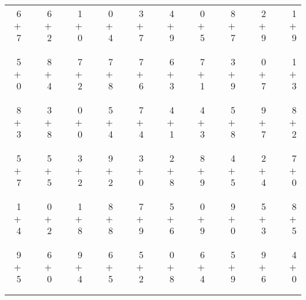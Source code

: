 \documentclass[12pt, letterpaper]{article}
\begin{document}
\begin{tabular}{rrrrrrrrrrrrrrrrrrr}
6 & & 6 & & 1 & & 0 & & 3 & & 4 & & 0 & & 8 & & 2 & & 1\\
$+$ 7 & & $+$ 2 & & $+$ 0 & & $+$ 4 & & $+$ 7 & & $+$ 9 & & $+$ 5 & & $+$ 7 & & $+$ 9 & & $+$ 9\\
\cline{1-1} \cline{3-3} \cline{5-5} \cline{7-7} \cline{9-9} \cline{11-11} \cline{13-13} \cline{15-15} \cline{17-17} \cline{19-19} \\ \\
5 & & 8 & & 7 & & 7 & & 7 & & 6 & & 7 & & 3 & & 0 & & 1\\
$+$ 0 & & $+$ 4 & & $+$ 2 & & $+$ 8 & & $+$ 6 & & $+$ 3 & & $+$ 1 & & $+$ 9 & & $+$ 7 & & $+$ 3\\
\cline{1-1} \cline{3-3} \cline{5-5} \cline{7-7} \cline{9-9} \cline{11-11} \cline{13-13} \cline{15-15} \cline{17-17} \cline{19-19} \\ \\
8 & & 3 & & 0 & & 5 & & 7 & & 4 & & 4 & & 5 & & 9 & & 8\\
$+$ 3 & & $+$ 8 & & $+$ 0 & & $+$ 4 & & $+$ 4 & & $+$ 1 & & $+$ 3 & & $+$ 8 & & $+$ 7 & & $+$ 2\\
\cline{1-1} \cline{3-3} \cline{5-5} \cline{7-7} \cline{9-9} \cline{11-11} \cline{13-13} \cline{15-15} \cline{17-17} \cline{19-19} \\ \\
5 & & 5 & & 3 & & 9 & & 3 & & 2 & & 8 & & 4 & & 2 & & 7\\
$+$ 7 & & $+$ 5 & & $+$ 2 & & $+$ 2 & & $+$ 0 & & $+$ 8 & & $+$ 9 & & $+$ 5 & & $+$ 4 & & $+$ 0\\
\cline{1-1} \cline{3-3} \cline{5-5} \cline{7-7} \cline{9-9} \cline{11-11} \cline{13-13} \cline{15-15} \cline{17-17} \cline{19-19} \\ \\
1 & & 0 & & 1 & & 8 & & 7 & & 5 & & 0 & & 9 & & 5 & & 8\\
$+$ 4 & & $+$ 2 & & $+$ 8 & & $+$ 8 & & $+$ 9 & & $+$ 6 & & $+$ 9 & & $+$ 0 & & $+$ 3 & & $+$ 5\\
\cline{1-1} \cline{3-3} \cline{5-5} \cline{7-7} \cline{9-9} \cline{11-11} \cline{13-13} \cline{15-15} \cline{17-17} \cline{19-19} \\ \\
9 & & 6 & & 9 & & 6 & & 5 & & 0 & & 6 & & 5 & & 9 & & 4\\
$+$ 5 & & $+$ 0 & & $+$ 4 & & $+$ 5 & & $+$ 2 & & $+$ 8 & & $+$ 4 & & $+$ 9 & & $+$ 6 & & $+$ 0\\
\cline{1-1} \cline{3-3} \cline{5-5} \cline{7-7} \cline{9-9} \cline{11-11} \cline{13-13} \cline{15-15} \cline{17-17} \cline{19-19} \\ \\

\end{tabular}
\end{document}
